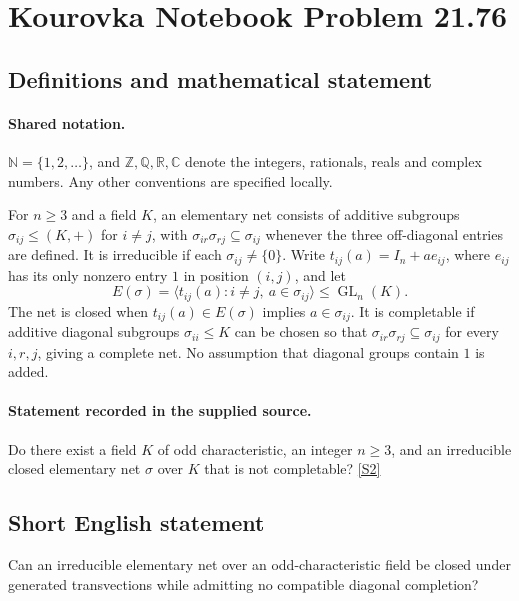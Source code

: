 \documentclass[11pt]{article}
\newcommand{\sref}[2]{\hyperlink{source:#1:#2}{[S#2]}}
\begin{document}
\section{Kourovka Notebook Problem 21.76}\label{statement}

\subsection{Definitions and mathematical statement}

\paragraph{Shared notation.}$\mathbb N=\{1,2,\ldots\}$, and $\mathbb Z,\mathbb Q,\mathbb R,\mathbb C$ denote the integers, rationals, reals and complex numbers. Any other conventions are specified locally.


For $n\geq3$ and a field $K$, an elementary net consists of additive subgroups $\sigma_{ij}\leq(K,+)$ for $i\ne j$, with $\sigma_{ir}\sigma_{rj}\subseteq\sigma_{ij}$ whenever the three off-diagonal entries are defined. It is irreducible if each $\sigma_{ij}\ne\{0\}$. Write $t_{ij}(a)=I_n+a e_{ij}$, where $e_{ij}$ has its only nonzero entry $1$ in position $(i,j)$, and let
\[
 E(\sigma)=\langle t_{ij}(a):i\ne j,\ a\in\sigma_{ij}\rangle\leq\operatorname{GL}_n(K).
\]
The net is closed when $t_{ij}(a)\in E(\sigma)$ implies $a\in\sigma_{ij}$. It is completable if additive diagonal subgroups $\sigma_{ii}\leq K$ can be chosen so that $\sigma_{ir}\sigma_{rj}\subseteq\sigma_{ij}$ for every $i,r,j$, giving a complete net. No assumption that diagonal groups contain $1$ is added.
\paragraph{Statement recorded in the supplied source.}
Do there exist a field $K$ of odd characteristic, an integer $n\geq3$, and an irreducible closed elementary net $\sigma$ over $K$ that is not completable? \sref{statement}{2}
\subsection{Short English statement}
Can an irreducible elementary net over an odd-characteristic field be closed under generated transvections while admitting no compatible diagonal completion?
\end{document}
